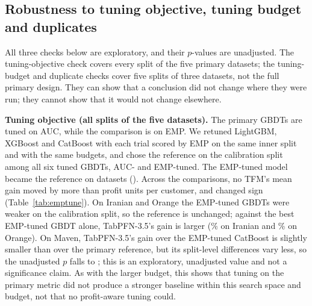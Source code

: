 \documentclass[11pt]{article}
\newcommand{\tfm}{TFM\xspace}
\begin{document}
\subsection{Robustness to tuning objective, tuning budget and duplicates}\label{sec:sens}

All three checks below are exploratory, and their $p$-values are unadjusted. The tuning-objective check covers every
split of the five primary datasets; the tuning-budget and duplicate checks cover five splits of three datasets, not the
full primary design. They can show that a conclusion did not change where they were run; they cannot show that it would
not change elsewhere.

\textbf{Tuning objective (all \nSeeds{} splits of the five datasets).} The primary GBDTs are tuned on AUC, while the
comparison is on EMP. We retuned LightGBM, XGBoost and CatBoost with each trial scored by EMP on the same inner split
and with the same budgets, and chose the reference on the calibration split among all six tuned GBDTs, AUC- and
EMP-tuned. The EMP-tuned model became the reference on \nEmpRefDatasets{} datasets (\empRefDatasets). Across the
\nPrimary{} comparisons, no \tfm's mean gain moved by more than \maxEmpTuneShift{} profit units per customer, and
\nEmpTuneSignFlip{} changed sign (Table~\ref{tab:emptune}). On Iranian and Orange the EMP-tuned GBDTs were weaker on
the calibration split, so the reference is unchanged; against the best EMP-tuned GBDT alone, TabPFN-3.5's gain is
larger (\empTunedPFNThreeIranianAbs\% on Iranian and \empTunedPFNThreeOrangeAbs\% on Orange). On Maven, TabPFN-3.5's gain over the
EMP-tuned CatBoost is slightly smaller than over the primary reference, but its split-level differences vary less, so
the unadjusted $p$ falls to \anyTunedPFNThreeMavenP; this is an exploratory, unadjusted value and not a significance
claim. As with the larger
budget, this shows that tuning on the primary metric did not produce a stronger baseline within this search space and
budget, not that no profit-aware tuning could.
\end{document}
